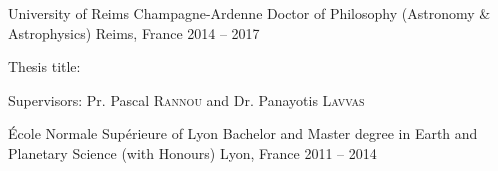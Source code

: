 
\begin{cventries}

  \cventry
    {University of Reims Champagne-Ardenne}
    {Doctor of Philosophy (Astronomy \& Astrophysics)}
    {Reims, France}
    {2014 -- 2017}
    {
      \begin{cvitems}
        \item{Thesis title: }
        \item{Supervisors: Pr. Pascal \textsc{Rannou} and Dr. Panayotis \textsc{Lavvas}}
      \end{cvitems}
      \vspace{1em}
    }

  \cventry
    {École Normale Supérieure of Lyon}
    {Bachelor and Master degree in Earth and Planetary Science (with Honours)}
    {Lyon, France}
    {2011 -- 2014}
    {}

\end{cventries}
